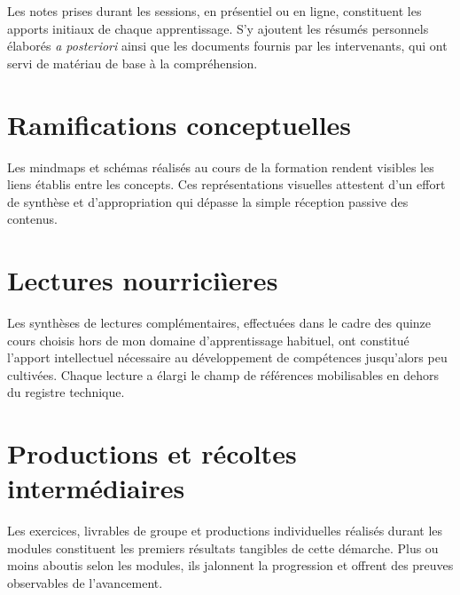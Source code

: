 Les notes prises durant les sessions, en présentiel ou en ligne, constituent les apports initiaux de chaque apprentissage. S'y ajoutent les résumés personnels élaborés \textit{a posteriori} ainsi que les documents fournis par les intervenants, qui ont servi de matériau de base à la compréhension.

\section{Ramifications conceptuelles}

Les mindmaps et schémas réalisés au cours de la formation rendent visibles les liens établis entre les concepts. Ces représentations visuelles attestent d'un effort de synthèse et d'appropriation qui dépasse la simple réception passive des contenus.

\section{Lectures nourrici\`ieres}

Les synthèses de lectures complémentaires, effectuées dans le cadre des quinze cours choisis hors de mon domaine d'apprentissage habituel, ont constitué l'apport intellectuel nécessaire au développement de compétences jusqu'alors peu cultivées. Chaque lecture a élargi le champ de références mobilisables en dehors du registre technique.

\section{Productions et récoltes intermédiaires}

Les exercices, livrables de groupe et productions individuelles réalisés durant les modules constituent les premiers résultats tangibles de cette démarche. Plus ou moins aboutis selon les modules, ils jalonnent la progression et offrent des preuves observables de l'avancement.

